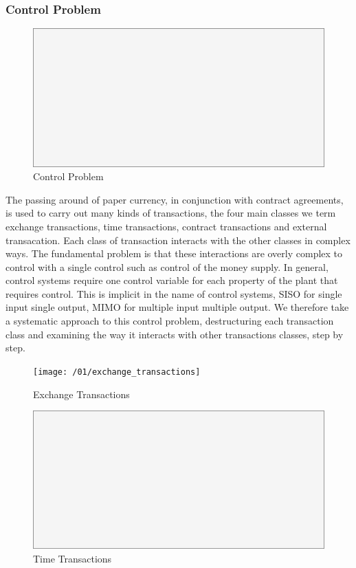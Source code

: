 \subsubsection{Control Problem}

\begin{figure}[H]
\centering
\includegraphics[scale=0.48]{blank}
\caption{Control Problem}
\label{fig:control_problem}
\end{figure}

The passing around of paper currency, in conjunction with contract agreements, is used to carry
out many kinds of transactions, the four main classes we term exchange transactions, time
transactions, contract transactions and external transacation. Each class of transaction interacts
with the other classes in complex ways. The fundamental problem is that these interactions are
overly complex to control with a single control such as control of the money supply. In general,
control systems require one control variable for each property of the plant that requires control.
This is implicit in the name of control systems, SISO for single input single output, MIMO for
multiple input multiple output. We therefore take a systematic approach to this control problem,
destructuring each transaction class and examining the way it interacts with other transactions
classes, step by step.

\begin{figure}[H]
\centering
\texttt{[image: /01/exchange\_transactions]}
\caption{Exchange Transactions}
\label{fig:exchange_transactions}
\end{figure}

\begin{figure}[H]
\centering
\includegraphics[scale=0.48]{blank}
\caption{Time Transactions}
\label{fig:time_transactions}
\end{figure}

